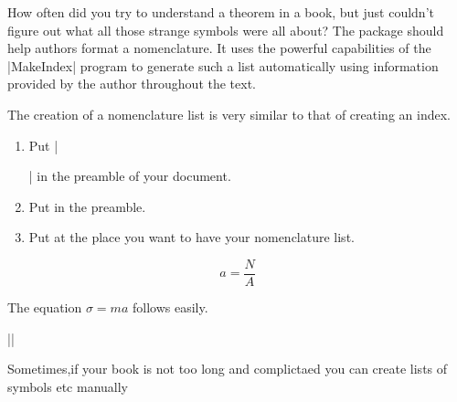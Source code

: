 How often did you try to understand a theorem in a book, but just couldn’t
figure out what all those strange symbols were all about? The 
package should help authors format a nomenclature. It uses the powerful
capabilities of the |MakeIndex| program to generate such a list automatically
using information provided by the author throughout the text.

The creation of a nomenclature list is very similar to that of creating an index.

\begin{enumerate}
\item Put |\usepackage[<options>]{nomenc}|  in the preamble of your document.

\item Put  in the preamble.

\item Put  at the place you want to have your nomenclature
list.
\end{enumerate}

\begin{teX}
\begin{equation}
a=\frac{N}{A}
\end{equation}%

%
%
%
The equation $\sigma = m a$%
%
follows easily.
\end{teX}


\begin{teX}
\end{teX}

|\printnomenclature|


Sometimes,if your book is not too long and complictaed you can create lists of symbols etc
manually

